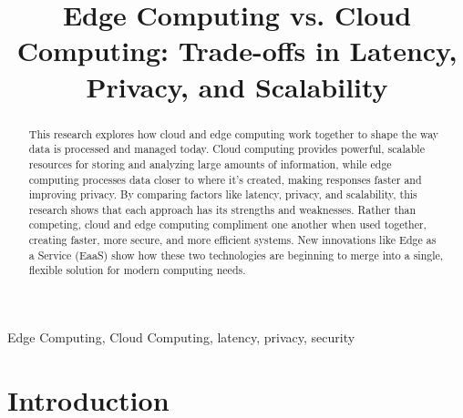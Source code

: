 \documentclass[conference]{IEEEtran}
\begin{document}
\title{Edge Computing vs. Cloud Computing: Trade-offs in Latency, Privacy, and Scalability 
}

\author{
\and

\and

\and


}

\maketitle

\begin{abstract}
This research explores how cloud and edge computing work together to shape the way data is processed and managed today. Cloud computing provides powerful, scalable resources for storing and analyzing large amounts of information, while edge computing processes data closer to where it’s created, making responses faster and improving privacy. By comparing factors like latency, privacy, and scalability, this research shows that each approach has its strengths and weaknesses. Rather than competing, cloud and edge computing compliment one another when used together, creating faster, more secure, and more efficient systems. New innovations like Edge as a Service (EaaS) show how these two technologies are beginning to merge into a single, flexible solution for modern computing needs.
\end{abstract}

\begin{IEEEkeywords}
Edge Computing, Cloud Computing, latency, privacy, security
\end{IEEEkeywords}

\section{Introduction}
\end{document}
